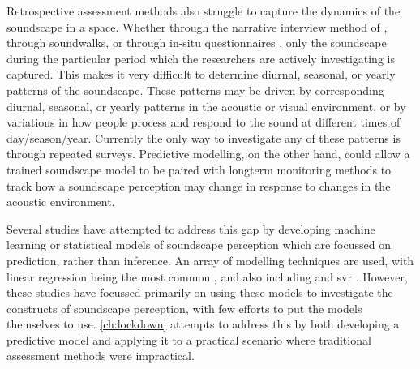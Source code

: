 Retrospective assessment methods also struggle to capture the dynamics of the soundscape in a space. Whether through the narrative interview method of \citet[Sec. 5.4]{ISO12913Part2}, through soundwalks, or through in-situ questionnaires \citep{Mitchell2020Soundscape}, only the soundscape during the particular period which the researchers are actively investigating is captured. This makes it very difficult to determine diurnal, seasonal, or yearly patterns of the soundscape. These patterns may be driven by corresponding diurnal, seasonal, or yearly patterns in the acoustic or visual environment, or by variations in how people process and respond to the sound at different times of day/season/year. Currently the only way to investigate any of these patterns is through repeated surveys. Predictive modelling, on the other hand, could allow a trained soundscape model to be paired with longterm monitoring methods to track how a soundscape perception may change in response to changes in the acoustic environment.

Several studies have attempted to address this gap by developing machine learning or statistical models of soundscape perception which are focussed on prediction, rather than inference. An array of modelling techniques are used, with linear regression being the most common \citep{Lionello2020systematic}, and also including  \citep{Yu2009Modeling,PuyanaRomero2016Modelling} and \gls{svr} \citep{Giannakopoulos2019Athens,Fan2016Automatic,Fan2017Emo}. However, these studies have focussed primarily on using these models to investigate the constructs of soundscape perception, with few efforts to put the models themselves to use. \cref{ch:lockdown} attempts to address this by both developing a predictive model and applying it to a practical scenario where traditional assessment methods were impractical.

